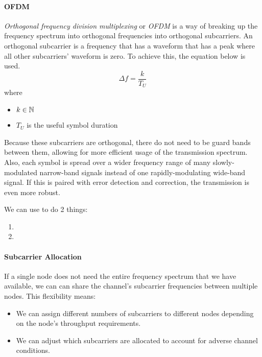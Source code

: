 \paragraph{OFDM}\label{par:OFDM}
\begin{definition}\label{def:OFDM}
  \emph{Orthogonal frequency division multiplexing} or \emph{OFDM} is a way of breaking up the frequency spectrum into orthogonal frequencies into orthogonal subcarriers.
  An orthogonal subcarrier is a frequency that has a waveform that has a peak where all other subcarriers' waveform is zero.
  To achieve this, the equation below is used.
  \begin{equation}\label{eq:Orthogonal_Subcarrier}
    \Delta f = \frac{k}{T_{U}}
  \end{equation}
  where
  \begin{itemize}[noitemsep]
  \item $k \in \operatorname{\mathbb{N}}$
  \item $T_{U}$ is the useful symbol duration
  \end{itemize}

  Because these subcarriers are orthogonal, there do not need to be guard bands between them, allowing for more efficient usage of the transmission spectrum.
  Also, each symbol is spread over a wider frequency range of many slowly-modulated narrow-band signals instead of one rapidly-modulating wide-band signal.
  If this is paired with error detection and correction, the transmission is even more robust.
\end{definition}

We can use  to do 2 things:
\begin{enumerate}[noitemsep]
\item {}
\item {}
\end{enumerate}

\paragraph{Subcarrier Allocation}\label{par:Subcarrier_Allocation}
If a single node does not need the entire frequency spectrum that we have available, we can can share the channel's subcarrier frequencies between multiple nodes.
This flexibility means:
\begin{itemize}[noitemsep]
\item We can assign different numbers of subcarriers to different nodes depending on the node's throughput requirements.
\item We can adjust which subcarriers are allocated to account for adverse channel conditions.
\end{itemize}


